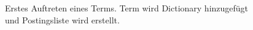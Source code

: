 \begin{figure}[ht]
    \caption{Erstes Auftreten eines Terms. Term wird Dictionary hinzugefügt und Postingsliste wird erstellt.}
   \label{fig:subfigure1}
\end{figure}


